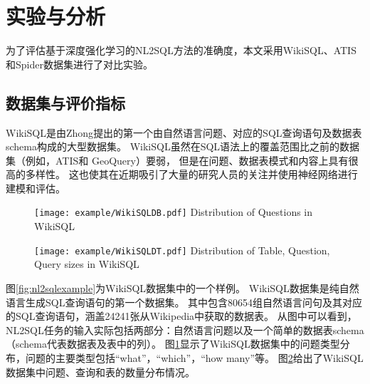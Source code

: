 \section{实验与分析}
为了评估基于深度强化学习的NL2SQL方法的准确度，本文采用WikiSQL、ATIS和Spider数据集进行了对比实验。

\subsection{数据集与评价指标}
WikiSQL是由Zhong\cite{zhong2017seq2sql}提出的第一个由自然语言问题、对应的SQL查询语句及数据表schema构成的大型数据集。
WikiSQL虽然在SQL语法上的覆盖范围比之前的数据集（例如，ATIS\cite{price1990evaluation,Dahl1994Expanding}和 GeoQuery\cite{Zelle2008Learning}）要弱，
但是在问题、数据表模式和内容上具有很高的多样性。
这也使其在近期吸引了大量的研究人员的关注并使用神经网络进行建模和评估\cite{zhong2017seq2sql,dong2016language,xu2017sqlnet,yu2018typesql,wang2018pointing,huang2018natural,wang2018execution}。

\begin{figure}[!htp]
  \centering
  \texttt{[image: example/WikiSQLDB.pdf]}
    {Distribution of Questions in WikiSQL}
  \label{fig:WikiSQLDB}
\end{figure}

\begin{figure}[!htp]
  \centering
  \texttt{[image: example/WikiSQLDT.pdf]}
    {Distribution of Table, Question, Query sizes in WikiSQL}
  \label{fig:WikiSQLDT}
\end{figure}

图\ref{fig:nl2sqlexample}为WikiSQL数据集\cite{zhong2017seq2sql}中的一个样例。
WikiSQL数据集是纯自然语言生成SQL查询语句的第一个数据集。
其中包含80654组自然语言问句及其对应的SQL查询语句，涵盖24241张从Wikipedia中获取的数据表。
从图中可以看到，NL2SQL任务的输入实际包括两部分：自然语言问题以及一个简单的数据表schema（schema代表数据表及表中的列）。
图\ref{fig:WikiSQLDB}显示了WikiSQL数据集中的问题类型分布，问题的主要类型包括“what”，“which”，“how many”等。
图\ref{fig:WikiSQLDT}给出了WikiSQL数据集中问题、查询和表的数量分布情况。

